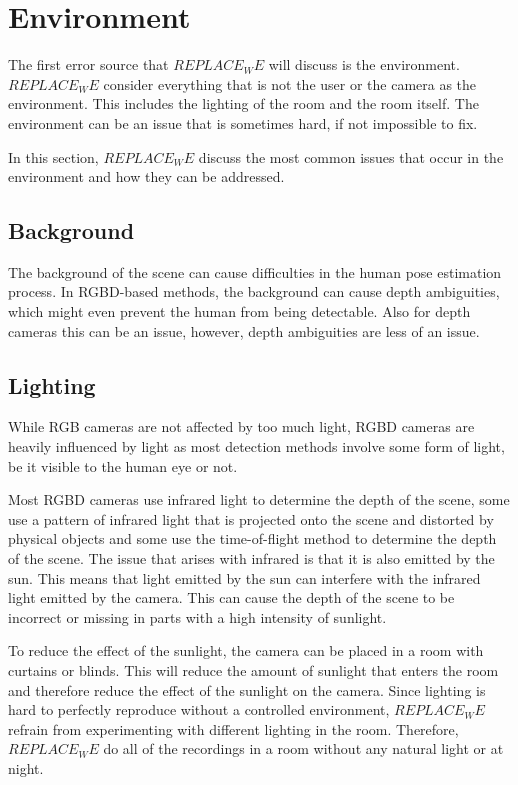 \section{Environment}

The first error source that $REPLACE_WE$ will discuss is the environment. $REPLACE_WE$ consider everything that is not the user or the camera as the environment. This includes the lighting of the room and the room itself. The environment can be an issue that is sometimes hard, if not impossible to fix. 

In this section, $REPLACE_WE$ discuss the most common issues that occur in the environment and how they can be addressed.

\subsection{Background}

The background of the scene can cause difficulties in the human pose estimation process. In RGBD-based methods, the background can cause depth ambiguities, which might even prevent the human from being detectable. Also for depth cameras this can be an issue, however, depth ambiguities are less of an issue.

\subsection{Lighting}

While RGB cameras are not affected by too much light, RGBD cameras are heavily influenced by light as most detection methods involve some form of light, be it visible to the human eye or not.

Most RGBD cameras use infrared light to determine the depth of the scene, some use a pattern of infrared light that is projected onto the scene and distorted by physical objects and some use the time-of-flight method to determine the depth of the scene. The issue that arises with infrared is that it is also emitted by the sun. This means that light emitted by the sun can interfere with the infrared light emitted by the camera. This can cause the depth of the scene to be incorrect or missing in parts with a high intensity of sunlight.

To reduce the effect of the sunlight, the camera can be placed in a room with curtains or blinds. This will reduce the amount of sunlight that enters the room and therefore reduce the effect of the sunlight on the camera. Since lighting is hard to perfectly reproduce without a controlled environment, $REPLACE_WE$ refrain from experimenting with different lighting in the room. Therefore, $REPLACE_WE$ do all of the recordings in a room without any natural light or at night.


